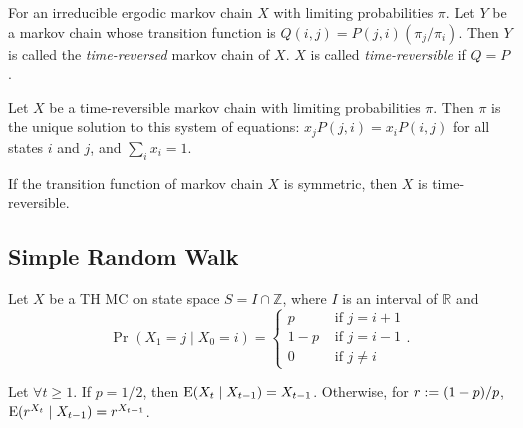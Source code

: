 \documentclass[a4paper, 12pt, fleqn]{article}
\begin{document}
\begin{definition}
For an irreducible ergodic markov chain $X$ with limiting probabilities $\pi$.
Let $Y$ be a markov chain whose transition function is $Q(i, j) = P(j, i)(\pi_j/\pi_i)$.
Then $Y$ is called the \emph{time-reversed} markov chain of $X$.
$X$ is called \emph{time-reversible} if $Q = P$.
\end{definition}

\begin{theorem}
Let $X$ be a time-reversible markov chain with limiting probabilities $\pi$.
Then $\pi$ is the unique solution to this system of equations:
$x_jP(j, i) = x_iP(i, j)$ for all states $i$ and $j$, and $\sum_i x_i = 1$.
\end{theorem}

\begin{theorem}
If the transition function of markov chain $X$ is symmetric, then $X$ is time-reversible.
\end{theorem}

\subsection{Simple Random Walk}

Let $X$ be a TH MC on state space $S = I \cap \mathbb{Z}$,
where $I$ is an interval of $\mathbb{R}$ and
\[ \Pr(X_1 = j \mid X_0 = i) = \begin{cases}
p & \textrm{ if } j = i+1
\\ 1-p & \textrm{ if } j = i-1
\\ 0 & \textrm{ if } j \neq i
\end{cases}. \]

\begin{lemma}
\label{thm:rand-walk:martin}
Let $\forall t \ge 1$. If $p = 1/2$, then $\operatorname*{E}(X_t \mid X_{t-1}) = X_{t-1}$.
Otherwise, for $r := (1-p)/p$, $\operatorname*{E}(r^{X_t} \mid X_{t-1}) = r^{X_{t-1}}$.
\end{lemma}
\end{document}
